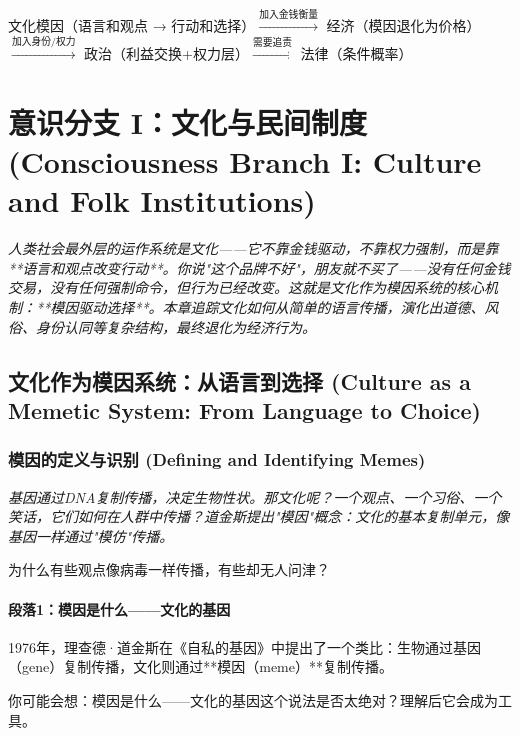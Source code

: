 \documentclass[a4paper,12pt]{book}
\newenvironment{motivation}{\begin{tcolorbox}[colback=gray!10,colframe=gray!60,title=\textit{动机}]\small\itshape}{\end{tcolorbox}}
\newenvironment{logicmap}{\begin{tcolorbox}[colback=blue!5,colframe=blue!50,title=\textbf{逻辑地图}]\centering}{\end{tcolorbox}}
\newenvironment{questionbox}{\begin{tcolorbox}[colback=red!3,colframe=red!60]}{\end{tcolorbox}}
\begin{document}
\begin{motivation}
\begin{motivation}
\begin{motivation}


	\begin{logicmap}
		文化模因（语言和观点 → 行动和选择）$\xrightarrow{\text{加入金钱衡量}}$ 经济（模因退化为价格）$\xrightarrow{\text{加入身份/权力}}$ 政治（利益交换+权力层）$\xrightarrow{\text{需要追责}}$ 法律（条件概率）
	\end{logicmap}

	\chapter{意识分支 I：文化与民间制度 (Consciousness Branch I: Culture and Folk Institutions)}
	\begin{motivation}
		人类社会最外层的运作系统是文化——它不靠金钱驱动，不靠权力强制，而是靠**语言和观点改变行动**。你说"这个品牌不好"，朋友就不买了——没有任何金钱交易，没有任何强制命令，但行为已经改变。这就是文化作为模因系统的核心机制：**模因驱动选择**。本章追踪文化如何从简单的语言传播，演化出道德、风俗、身份认同等复杂结构，最终退化为经济行为。
	\end{motivation}

	\section{文化作为模因系统：从语言到选择 (Culture as a Memetic System: From Language to Choice)}

	\subsection{模因的定义与识别 (Defining and Identifying Memes)}
	\begin{motivation}
		基因通过DNA复制传播，决定生物性状。那文化呢？一个观点、一个习俗、一个笑话，它们如何在人群中传播？道金斯提出"模因"概念：文化的基本复制单元，像基因一样通过"模仿"传播。
	\end{motivation}
	\begin{questionbox}
		为什么有些观点像病毒一样传播，有些却无人问津？
	\end{questionbox}

	\subsubsection*{段落1：模因是什么——文化的基因}
	1976年，理查德·道金斯在《自私的基因》中提出了一个类比：生物通过基因（gene）复制传播，文化则通过**模因（meme）**复制传播。
	\begin{tcolorbox}[colback=yellow!5, title=\textit{读者行为预测}]
		你可能会想：模因是什么——文化的基因这个说法是否太绝对？理解后它会成为工具。
	\end{tcolorbox}


\end{motivation}
\end{motivation}
\end{motivation}
\end{document}
